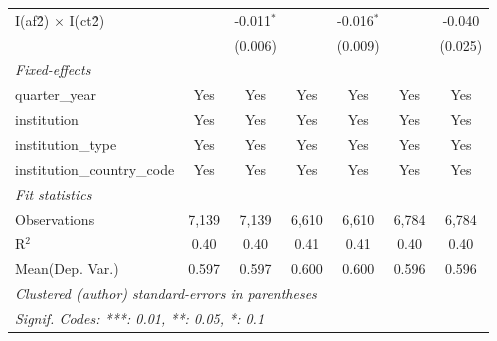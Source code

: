 \begin{tabular}{lcccccc}
   I(af\^2) $\times$ I(ct\^2)         &               & -0.011$^{*}$   &               & -0.016$^{*}$   &               & -0.040\\   
                                      &               & (0.006)        &               & (0.009)        &               & (0.025)\\   
   \midrule
   \emph{Fixed-effects}\\
   quarter\_year                      & Yes           & Yes            & Yes           & Yes            & Yes           & Yes\\  
   institution                        & Yes           & Yes            & Yes           & Yes            & Yes           & Yes\\  
   institution\_type                  & Yes           & Yes            & Yes           & Yes            & Yes           & Yes\\  
   institution\_country\_code         & Yes           & Yes            & Yes           & Yes            & Yes           & Yes\\  
   \midrule
   \emph{Fit statistics}\\
   Observations                       & 7,139         & 7,139          & 6,610         & 6,610          & 6,784         & 6,784\\  
   R$^2$                              & 0.40          & 0.40           & 0.41          & 0.41           & 0.40          & 0.40\\  
Mean(Dep. Var.) & 0.597 & 0.597 & 0.600 & 0.600 & 0.596 & 0.596 \\
   \midrule \midrule
   \multicolumn{7}{l}{\emph{Clustered (author) standard-errors in parentheses}}\\
   \multicolumn{7}{l}{\emph{Signif. Codes: ***: 0.01, **: 0.05, *: 0.1}}\\
\end{tabular}
\par\endgroup
